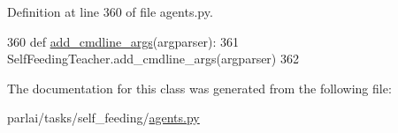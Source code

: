 Definition at line 360 of file agents.\+py.


\begin{DoxyCode}
360     \textcolor{keyword}{def }\hyperlink{namespaceparlai_1_1agents_1_1drqa_1_1config_a62fdd5554f1da6be0cba185271058320}{add\_cmdline\_args}(argparser):
361         SelfFeedingTeacher.add\_cmdline\_args(argparser)
362 \end{DoxyCode}


The documentation for this class was generated from the following file\+:\begin{DoxyCompactItemize}
\item 
parlai/tasks/self\+\_\+feeding/\hyperlink{parlai_2tasks_2self__feeding_2agents_8py}{agents.\+py}\end{DoxyCompactItemize}
